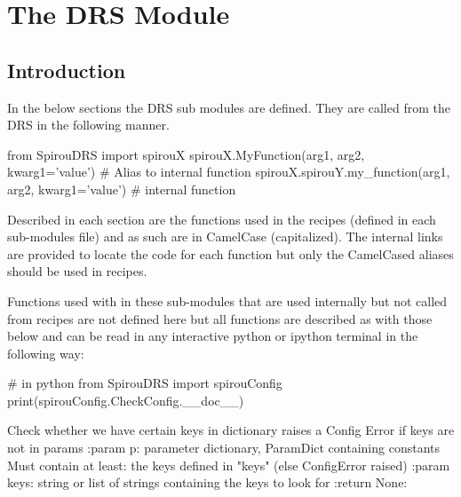 \chapter{The DRS Module}
\label{ch:the_module}

\section{Introduction}
\label{ch:the_module:intro}

In the below sections the DRS sub modules are defined. They are called from the DRS in the following manner. \\

\begin{pythonbox}
from SpirouDRS import spirouX
spirouX.MyFunction(arg1, arg2, kwarg1='value')   # Alias to internal function
spirouX.spirouY.my_function(arg1, arg2, kwarg1='value')   # internal function
\end{pythonbox}

\noindent Described in each section are the functions used in the recipes (defined in each sub-modules  file) and as such are in CamelCase (capitalized). The internal links are provided to locate the code for each function but only the CamelCased aliases should be used in recipes. 

Functions used with in these sub-modules that are used internally but not called from recipes are not defined here but all functions are described as with those below and can be read in any interactive python or ipython terminal in the following way: \\

\noindent\begin{minipage}{\textwidth}
\begin{pythonbox}
# in python
from SpirouDRS import spirouConfig
print(spirouConfig.CheckConfig.__doc__)
\end{pythonbox}
\vspace{-0.25cm}
\begin{cmdboxprint}
Check whether we have certain keys in dictionary
raises a Config Error if keys are not in params
:param p: parameter dictionary, ParamDict containing constants
    Must contain at least:
        the keys defined in "keys" (else ConfigError raised)
:param keys: string or list of strings containing the keys to look for
:return None:
\end{cmdboxprint}
\end{minipage}

